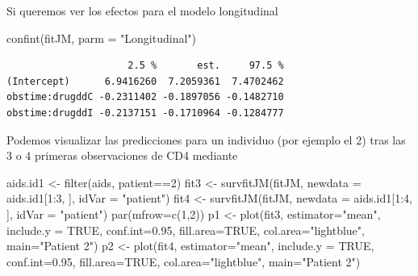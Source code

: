 \documentclass[
]{book}
\newenvironment{Shaded}{\begin{snugshade}}{\end{snugshade}}
\newcommand{\AttributeTok}[1]{\textcolor[rgb]{0.77,0.63,0.00}{#1}}
\newcommand{\ConstantTok}[1]{\textcolor[rgb]{0.00,0.00,0.00}{#1}}
\newcommand{\DecValTok}[1]{\textcolor[rgb]{0.00,0.00,0.81}{#1}}
\newcommand{\FloatTok}[1]{\textcolor[rgb]{0.00,0.00,0.81}{#1}}
\newcommand{\FunctionTok}[1]{\textcolor[rgb]{0.00,0.00,0.00}{#1}}
\newcommand{\NormalTok}[1]{#1}
\newcommand{\OtherTok}[1]{\textcolor[rgb]{0.56,0.35,0.01}{#1}}
\newcommand{\SpecialCharTok}[1]{\textcolor[rgb]{0.00,0.00,0.00}{#1}}
\newcommand{\StringTok}[1]{\textcolor[rgb]{0.31,0.60,0.02}{#1}}
\begin{document}
Si queremos ver los efectos para el modelo longitudinal

\begin{Shaded}
\begin{Highlighting}[]
\FunctionTok{confint}\NormalTok{(fitJM, }\AttributeTok{parm =} \StringTok{"Longitudinal"}\NormalTok{)}
\end{Highlighting}
\end{Shaded}

\begin{verbatim}
                     2.5 %       est.     97.5 %
(Intercept)      6.9416260  7.2059361  7.4702462
obstime:drugddC -0.2311402 -0.1897056 -0.1482710
obstime:drugddI -0.2137151 -0.1710964 -0.1284777
\end{verbatim}

Podemos visualizar las predicciones para un individuo (por ejemplo el 2) tras las 3 o 4 primeras observaciones de CD4 mediante

\begin{Shaded}
\begin{Highlighting}[]
\NormalTok{aids.id1 }\OtherTok{\textless{}{-}} \FunctionTok{filter}\NormalTok{(aids, patient}\SpecialCharTok{==}\DecValTok{2}\NormalTok{)}
\NormalTok{fit3 }\OtherTok{\textless{}{-}} \FunctionTok{survfitJM}\NormalTok{(fitJM, }\AttributeTok{newdata =}\NormalTok{ aids.id1[}\DecValTok{1}\SpecialCharTok{:}\DecValTok{3}\NormalTok{, ], }\AttributeTok{idVar =} \StringTok{"patient"}\NormalTok{) }
\NormalTok{fit4 }\OtherTok{\textless{}{-}} \FunctionTok{survfitJM}\NormalTok{(fitJM, }\AttributeTok{newdata =}\NormalTok{ aids.id1[}\DecValTok{1}\SpecialCharTok{:}\DecValTok{4}\NormalTok{, ], }\AttributeTok{idVar =} \StringTok{"patient"}\NormalTok{) }
\FunctionTok{par}\NormalTok{(}\AttributeTok{mfrow=}\FunctionTok{c}\NormalTok{(}\DecValTok{1}\NormalTok{,}\DecValTok{2}\NormalTok{))}
\NormalTok{p1 }\OtherTok{\textless{}{-}} \FunctionTok{plot}\NormalTok{(fit3, }\AttributeTok{estimator=}\StringTok{"mean"}\NormalTok{, }\AttributeTok{include.y =} \ConstantTok{TRUE}\NormalTok{, }\AttributeTok{conf.int=}\FloatTok{0.95}\NormalTok{, }
          \AttributeTok{fill.area=}\ConstantTok{TRUE}\NormalTok{, }\AttributeTok{col.area=}\StringTok{"lightblue"}\NormalTok{, }\AttributeTok{main=}\StringTok{"Patient 2"}\NormalTok{)}
\NormalTok{p2 }\OtherTok{\textless{}{-}} \FunctionTok{plot}\NormalTok{(fit4, }\AttributeTok{estimator=}\StringTok{"mean"}\NormalTok{, }\AttributeTok{include.y =} \ConstantTok{TRUE}\NormalTok{, }\AttributeTok{conf.int=}\FloatTok{0.95}\NormalTok{, }
           \AttributeTok{fill.area=}\ConstantTok{TRUE}\NormalTok{, }\AttributeTok{col.area=}\StringTok{"lightblue"}\NormalTok{, }\AttributeTok{main=}\StringTok{"Patient 2"}\NormalTok{)}
\end{Highlighting}
\end{Shaded}
\end{document}
